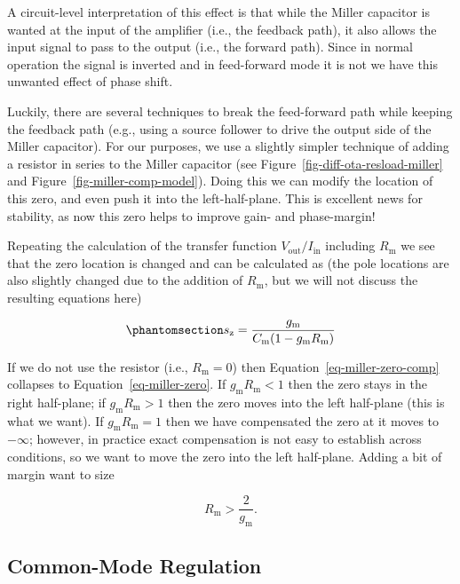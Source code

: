 \documentclass[
  a4paper,
  DIV=11,
  numbers=noendperiod]{scrartcl}
\begin{document}
A circuit-level interpretation of this effect is that while the Miller
capacitor is wanted at the input of the amplifier (i.e., the feedback
path), it also allows the input signal to pass to the output (i.e., the
forward path). Since in normal operation the signal is inverted and in
feed-forward mode it is not we have this unwanted effect of phase shift.

Luckily, there are several techniques to break the feed-forward path
while keeping the feedback path (e.g., using a source follower to drive
the output side of the Miller capacitor). For our purposes, we use a
slightly simpler technique of adding a resistor in series to the Miller
capacitor (see Figure~\ref{fig-diff-ota-resload-miller} and
Figure~\ref{fig-miller-comp-model}). Doing this we can modify the
location of this zero, and even push it into the left-half-plane. This
is excellent news for stability, as now this zero helps to improve gain-
and phase-margin!

Repeating the calculation of the transfer function
\(V_\mathrm{out} / I_\mathrm{in}\) including \(R_\mathrm{m}\) we see
that the zero location is changed and can be calculated as (the pole
locations are also slightly changed due to the addition of
\(R_\mathrm{m}\), but we will not discuss the resulting equations here)

\begin{equation}\phantomsection\label{eq-miller-zero-comp}{
s_\mathrm{z} = \frac{g_\mathrm{m}}{C_\mathrm{m} (1 - g_\mathrm{m}R_\mathrm{m})}
}\end{equation}

If we do not use the resistor (i.e., \(R_\mathrm{m}=0\)) then
Equation~\ref{eq-miller-zero-comp} collapses to
Equation~\ref{eq-miller-zero}. If \(g_\mathrm{m}R_\mathrm{m} < 1\) then
the zero stays in the right half-plane; if
\(g_\mathrm{m}R_\mathrm{m} > 1\) then the zero moves into the left
half-plane (this is what we want). If \(g_\mathrm{m}R_\mathrm{m} = 1\)
then we have compensated the zero at it moves to \(-\infty\); however,
in practice exact compensation is not easy to establish across
conditions, so we want to move the zero into the left half-plane. Adding
a bit of margin want to size

\[
R_\mathrm{m} > \frac{2}{g_\mathrm{m}}.
\]

\subsection{Common-Mode Regulation}\label{common-mode-regulation}
\end{document}
